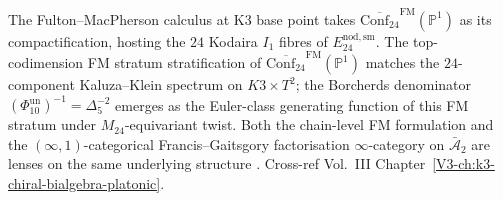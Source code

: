 \begin{remark}
\label{rem:fmc-1}
The Fulton--MacPherson calculus at K3 base point takes
$\overline{\mathrm{Conf}_{24}}^{\mathrm{FM}}(\mathbb P^1)$ as its
compactification, hosting the $24$ Kodaira $I_1$ fibres of
$E^{\mathrm{nod,sm}}_{24}$. The top-codimension FM stratum stratification
of $\overline{\mathrm{Conf}_{24}}^{\mathrm{FM}}(\mathbb P^1)$ matches
the $24$-component Kaluza--Klein spectrum on $K3\times T^2$; the Borcherds
denominator $(\Phi_{10}^{\mathrm{un}})^{-1} = \Delta_5^{-2}$ emerges as the Euler-class
generating function of this FM stratum under $M_{24}$-equivariant
twist. Both the chain-level FM formulation and the
$(\infty,1)$-categorical Francis--Gaitsgory factorisation
$\infty$-category on $\bar{\mathcal A}_2$ are lenses on the same
underlying structure \cite{FultonMacPherson1994,FrancisGaitsgoryFactorization,Borcherds1992}.
Cross-ref Vol.~III Chapter~\ref{V3-ch:k3-chiral-bialgebra-platonic}.
\end{remark}
